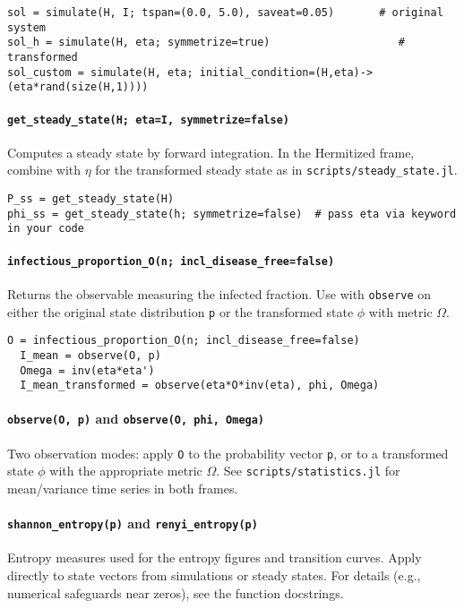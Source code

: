 \documentclass[11pt]{article}
\newcommand{\code}[1]{\texttt{#1}}
\begin{document}
\begin{Verbatim}[fontsize=\small]
sol = simulate(H, I; tspan=(0.0, 5.0), saveat=0.05)       # original system
sol_h = simulate(H, eta; symmetrize=true)                    # transformed
sol_custom = simulate(H, eta; initial_condition=(H,eta)->(eta*rand(size(H,1))))
\end{Verbatim}

\paragraph{\code{get\_steady\_state(H; eta=I, symmetrize=false)}} Computes a steady state by forward integration.
In the Hermitized frame, combine with \(\eta\) for the transformed steady state as in \code{scripts/steady\_state.jl}.

\begin{Verbatim}[fontsize=\small]
P_ss = get_steady_state(H)
phi_ss = get_steady_state(h; symmetrize=false)  # pass eta via keyword in your code
\end{Verbatim}

\paragraph{\code{infectious\_proportion\_O(n; incl\_disease\_free=false)}} Returns the observable measuring the infected fraction.
Use with \code{observe} on either the original state distribution \code{p} or the transformed state \(\phi\) with metric \(\Omega\).

\begin{Verbatim}[fontsize=\small]
  O = infectious_proportion_O(n; incl_disease_free=false)
  I_mean = observe(O, p)
  Omega = inv(eta*eta')
  I_mean_transformed = observe(eta*O*inv(eta), phi, Omega)
\end{Verbatim}

\paragraph{\code{observe(O, p)} and \code{observe(O, phi, Omega)}} Two observation modes: apply \code{O} to the probability vector \code{p}, or to a transformed state \(\phi\) with the appropriate metric \(\Omega\).
See \code{scripts/statistics.jl} for mean/variance time series in both frames.

\paragraph{\code{shannon\_entropy(p)} and \code{renyi\_entropy(p)}} Entropy measures used for the entropy figures and transition curves. Apply directly to state vectors from simulations or steady states.
For details (e.g., numerical safeguards near zeros), see the function docstrings.
\end{document}
